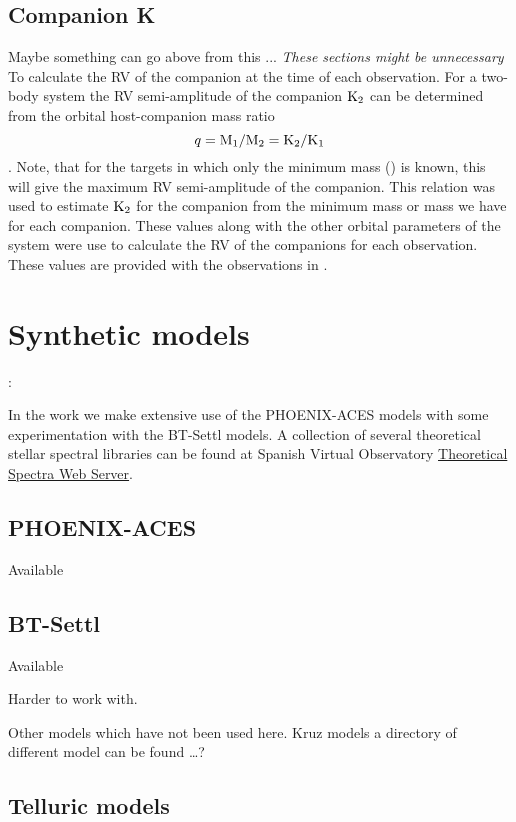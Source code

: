 \subsection{Companion K}  Maybe something can go above from this ...
\label{sec:companion_RV}
\emph{These sections might be unnecessary}\\

To calculate the {RV} of the companion at the time of each observation. For a two-body system the {RV} semi-amplitude of the companion \(\textrm{K}_{2}\) can be determined from the orbital host-companion mass ratio \[q = \textrm{M}_{1}/\textrm{M}_{2} = \textrm{K}_{2}/\textrm{K}_{1}\label{eqn:q_ratio_K2}\].
Note, that for the targets in which only the minimum mass (\mtwosini) is known, this will give the maximum {RV} semi-amplitude of the companion.
This relation was used to estimate \(\textrm{K}_{2}\) for the companion from the minimum mass or mass we have for each companion. These values along with the other orbital parameters of the system were use to calculate the {RV} of the companions for each observation. These values are provided with the observations in .


\section{Synthetic models}:

In the work we make extensive use of the {PHOENIX-ACES} models with some experimentation with the {BT-Settl} models.
A collection of several theoretical stellar spectral libraries can be found at Spanish Virtual Observatory \href{http://svo2.cab.inta-csic.es/theory/newov/index.php}{Theoretical Spectra Web Server}.

\subsection{PHOENIX-ACES}

Available 


\subsection{BT-Settl}

Available  

Harder to work with.

Other models which have not been used here. Kruz models a directory of different model can be found \ldots{}?

\subsection{Telluric models}

